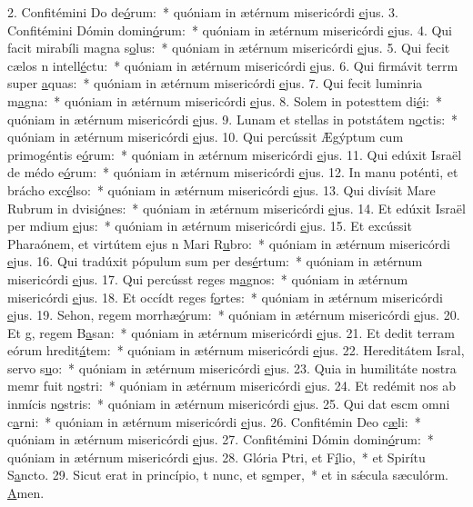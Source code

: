 2. Confitémini Do de\uline{ó}rum:~* quóniam in ætérnum misericórdi \uline{e}jus.
3. Confitémini Dómin domin\uline{ó}rum:~* quóniam in ætérnum misericórdi \uline{e}jus.
4. Qui facit mirabíli magna s\uline{o}lus:~* quóniam in ætérnum misericórdi \uline{e}jus.
5. Qui fecit cælos n intell\uline{é}ctu:~* quóniam in ætérnum misericórdi \uline{e}jus.
6. Qui firmávit terrm super \uline{a}quas:~* quóniam in ætérnum misericórdi \uline{e}jus.
7. Qui fecit luminria m\uline{a}gna:~* quóniam in ætérnum misericórdi \uline{e}jus.
8. Solem in potesttem di\uline{é}i:~* quóniam in ætérnum misericórdi \uline{e}jus.
9. Lunam et stellas in potstátem n\uline{o}ctis:~* quóniam in ætérnum misericórdi \uline{e}jus.
10. Qui percússit Ægýptum cum primogéntis e\uline{ó}rum:~* quóniam in ætérnum misericórdi \uline{e}jus.
11. Qui edúxit Israël de médo e\uline{ó}rum:~* quóniam in ætérnum misericórdi \uline{e}jus.
12. In manu poténti, et brácho exc\uline{é}lso:~* quóniam in ætérnum misericórdi \uline{e}jus.
13. Qui divísit Mare Rubrum in dvisi\uline{ó}nes:~* quóniam in ætérnum misericórdi \uline{e}jus.
14. Et edúxit Israël per mdium \uline{e}jus:~* quóniam in ætérnum misericórdi \uline{e}jus.
15. Et excússit Pharaónem, et virtútem ejus n Mari R\uline{u}bro:~* quóniam in ætérnum misericórdi \uline{e}jus.
16. Qui tradúxit pópulum sum per des\uline{é}rtum:~* quóniam in ætérnum misericórdi \uline{e}jus.
17. Qui percússt reges m\uline{a}gnos:~* quóniam in ætérnum misericórdi \uline{e}jus.
18. Et occídt reges f\uline{o}rtes:~* quóniam in ætérnum misericórdi \uline{e}jus.
19. Sehon, regem morrhæ\uline{ó}rum:~* quóniam in ætérnum misericórdi \uline{e}jus.
20. Et g, regem B\uline{a}san:~* quóniam in ætérnum misericórdi \uline{e}jus.
21. Et dedit terram eórum hredit\uline{á}tem:~* quóniam in ætérnum misericórdi \uline{e}jus.
22. Hereditátem Isral, servo s\uline{u}o:~* quóniam in ætérnum misericórdi \uline{e}jus.
23. Quia in humilitáte nostra memr fuit n\uline{o}stri:~* quóniam in ætérnum misericórdi \uline{e}jus.
24. Et redémit nos ab inmícis n\uline{o}stris:~* quóniam in ætérnum misericórdi \uline{e}jus.
25. Qui dat escm omni c\uline{a}rni:~* quóniam in ætérnum misericórdi \uline{e}jus.
26. Confitémin Deo c\uline{æ}li:~* quóniam in ætérnum misericórdi \uline{e}jus.
27. Confitémini Dómin domin\uline{ó}rum:~* quóniam in ætérnum misericórdi \uline{e}jus.
28. Glória Ptri, et F\uline{í}lio,~* et Spirítu S\uline{a}ncto.
29. Sicut erat in princípio, t nunc, et s\uline{e}mper,~* et in sǽcula sæculórm. \uline{A}men.
